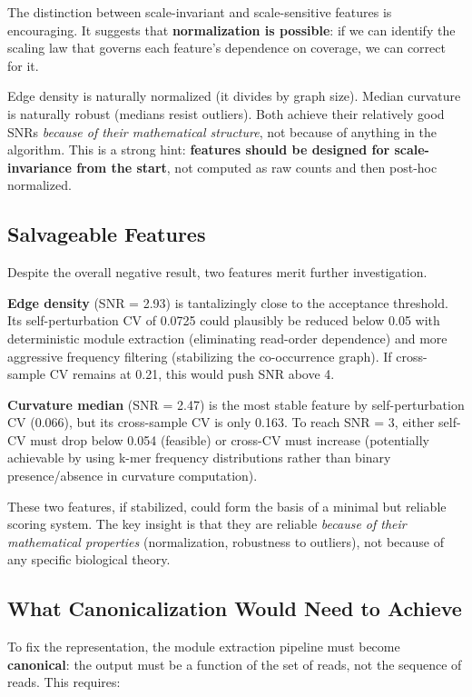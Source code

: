 \documentclass{../yalumba}
\begin{document}
The distinction between scale-invariant and scale-sensitive features
is encouraging.  It suggests that \textbf{normalization is possible}:
if we can identify the scaling law that governs each feature's
dependence on coverage, we can correct for it.

Edge density is naturally normalized (it divides by graph size).  Median
curvature is naturally robust (medians resist outliers).  Both achieve
their relatively good SNRs \emph{because of their mathematical
structure}, not because of anything in the algorithm.  This is a strong
hint: \textbf{features should be designed for scale-invariance from the
start}, not computed as raw counts and then post-hoc normalized.

\subsection{Salvageable Features}
\label{sec:salvageable}

Despite the overall negative result, two features merit further
investigation.

\textbf{Edge density} (SNR = 2.93) is tantalizingly close to the
acceptance threshold.  Its self-perturbation CV of 0.0725 could
plausibly be reduced below 0.05 with deterministic module extraction
(eliminating read-order dependence) and more aggressive frequency
filtering (stabilizing the co-occurrence graph).  If cross-sample CV
remains at 0.21, this would push SNR above 4.

\textbf{Curvature median} (SNR = 2.47) is the most stable feature
by self-perturbation CV (0.066), but its cross-sample CV is only 0.163.
To reach SNR = 3, either self-CV must drop below 0.054 (feasible) or
cross-CV must increase (potentially achievable by using k-mer frequency
distributions rather than binary presence/absence in curvature
computation).

These two features, if stabilized, could form the basis of a minimal
but reliable scoring system.  The key insight is that they are
reliable \emph{because of their mathematical properties} (normalization,
robustness to outliers), not because of any specific biological theory.

\subsection{What Canonicalization Would Need to Achieve}
\label{sec:canonicalization}

To fix the representation, the module extraction pipeline must become
\textbf{canonical}: the output must be a function of the set of reads,
not the sequence of reads.  This requires:
\end{document}
